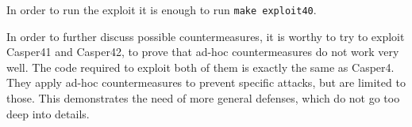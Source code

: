 
In order to run the exploit it is enough to run \texttt{make exploit40}.

In order to further discuss possible countermeasures, it is worthy to try to exploit Casper41 and Casper42, to prove that ad-hoc countermeasures do not work very well. The code required to exploit both of them is exactly the same as Casper4. They apply ad-hoc countermeasures to prevent specific attacks, but are limited to those. This demonstrates the need of more general defenses, which do not go too deep into details.